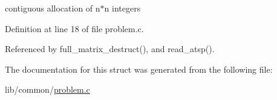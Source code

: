 contiguous allocation of n$\ast$n integers 

Definition at line 18 of file problem.c.

Referenced by full\_\-matrix\_\-destruct(), and read\_\-atsp().

The documentation for this struct was generated from the following file:\begin{CompactItemize}
\item 
lib/common/\hyperlink{problem_8c}{problem.c}\end{CompactItemize}
